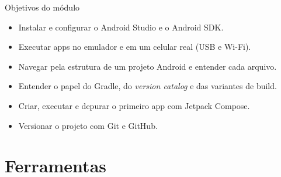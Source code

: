 \documentclass[aspectratio=169,10pt]{beamer}
\begin{document}
\capa

\begin{frame}{Objetivos do módulo}
  \begin{conceito}
    \begin{itemize}
      \item Instalar e configurar o Android Studio e o Android SDK.
      \item Executar apps no emulador e em um celular real (USB e Wi-Fi).
      \item Navegar pela estrutura de um projeto Android e entender cada arquivo.
      \item Entender o papel do Gradle, do \emph{version catalog} e das variantes de build.
      \item Criar, executar e depurar o primeiro app com Jetpack Compose.
      \item Versionar o projeto com Git e GitHub.
    \end{itemize}
  \end{conceito}
\end{frame}

\sumario

\section{Ferramentas}
\end{document}
